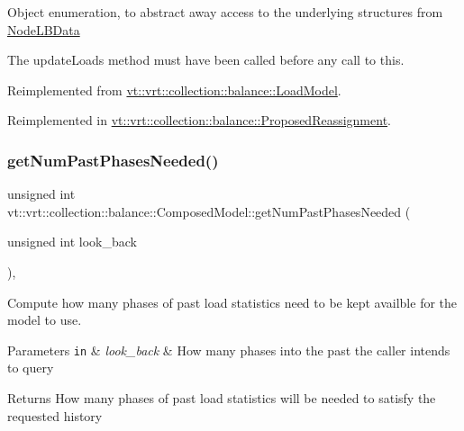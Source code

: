 Object enumeration, to abstract away access to the underlying structures from \hyperlink{structvt_1_1vrt_1_1collection_1_1balance_1_1_node_l_b_data}{Node\+L\+B\+Data}

The {\ttfamily update\+Loads} method must have been called before any call to this. 

Reimplemented from \hyperlink{structvt_1_1vrt_1_1collection_1_1balance_1_1_load_model_ab4027d0849dee5b28273094cc179abd2}{vt\+::vrt\+::collection\+::balance\+::\+Load\+Model}.



Reimplemented in \hyperlink{structvt_1_1vrt_1_1collection_1_1balance_1_1_proposed_reassignment_ad265d4881094bb11cb538e7340bc8a49}{vt\+::vrt\+::collection\+::balance\+::\+Proposed\+Reassignment}.

\mbox{\label{classvt_1_1vrt_1_1collection_1_1balance_1_1_composed_model_abf2a02ff624e66c7076bfe3dce961981}} 
\subsubsection{\texorpdfstring{get\+Num\+Past\+Phases\+Needed()}{getNumPastPhasesNeeded()}}
{\footnotesize\ttfamily unsigned int vt\+::vrt\+::collection\+::balance\+::\+Composed\+Model\+::get\+Num\+Past\+Phases\+Needed (\begin{DoxyParamCaption}\item[{unsigned int}]{look\+\_\+back }\end{DoxyParamCaption})\hspace{0.3cm}{\ttfamily [override]}, {\ttfamily [virtual]}}



Compute how many phases of past load statistics need to be kept availble for the model to use. 


\begin{DoxyParams}[1]{Parameters}
\mbox{\tt in}  & {\em look\+\_\+back} & How many phases into the past the caller intends to query\\
\hline
\end{DoxyParams}
\begin{DoxyReturn}{Returns}
How many phases of past load statistics will be needed to satisfy the requested history 
\end{DoxyReturn}


